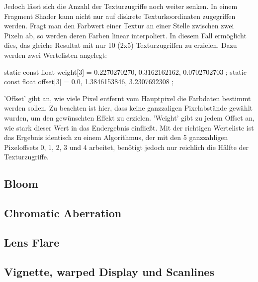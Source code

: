 Jedoch lässt sich die Anzahl der Texturzugriffe noch weiter senken. In einem Fragment Shader kann nicht nur auf diskrete Texturkoordinaten zugegriffen werden. Fragt man den Farbwert einer Textur an einer Stelle zwischen zwei Pixeln ab, so werden deren Farben linear interpoliert. In diesem Fall ermöglicht dies, das gleiche Resultat mit nur 10 (2x5) Texturzugriffen zu erzielen. Dazu werden zwei Wertelisten angelegt:
\begin{hlsl}
    static const float weight[3] = { 0.2270270270, 0.3162162162, 0.0702702703 };
    static const float offset[3] = { 0.0, 1.3846153846, 3.2307692308 };
\end{hlsl}
'Offset' gibt an, wie viele Pixel entfernt vom Hauptpixel die Farbdaten bestimmt werden sollen. Zu beachten ist hier, dass keine ganzzaligen Pixelabstände gewählt wurden, um den gewünschten Effekt zu erzielen.
'Weight' gibt zu jedem Offset an, wie stark dieser Wert in das Endergebnis einflie{\ss}t. Mit der richtigen Werteliste ist das Ergebnis identisch zu einem Algorithmus, der mit den 5 ganzzahligen Pixeloffsets 0, 1, 2, 3 und 4 arbeitet, benötigt jedoch nur reichlich die Hälfte der Texturzugriffe.




\subsection{Bloom}

\lipsum[3]



\subsection{Chromatic Aberration}

\lipsum[3]



\subsection{Lens Flare}

\lipsum[3]



\subsection{Vignette, warped Display und Scanlines}

\lipsum[3]
